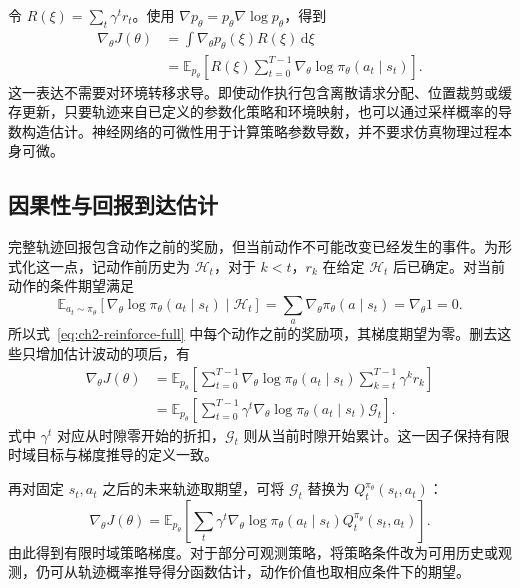 令 $R(\xi)=\sum_t\gamma^t r_t$。使用 $\nabla p_\theta=p_\theta\nabla\log p_\theta$，得到
\begin{align}
    \nabla_\theta J(\theta)
    &=\int \nabla_\theta p_\theta(\xi)R(\xi)\,\mathrm d\xi\\
    &=\mathbb E_{p_\theta}\left[R(\xi)\sum_{t=0}^{T-1}\nabla_\theta\log\pi_\theta(a_t\mid s_t)\right].
    \label{eq:ch2-reinforce-full}
\end{align}
这一表达不需要对环境转移求导。即使动作执行包含离散请求分配、位置裁剪或缓存更新，只要轨迹来自已定义的参数化策略和环境映射，也可以通过采样概率的导数构造估计。神经网络的可微性用于计算策略参数导数，并不要求仿真物理过程本身可微。

\subsection{因果性与回报到达估计}
\label{sec:ch2-reward-to-go}

完整轨迹回报包含动作之前的奖励，但当前动作不可能改变已经发生的事件。为形式化这一点，记动作前历史为 $\mathcal H_t$，对于 $k<t$，$r_k$ 在给定 $\mathcal H_t$ 后已确定。对当前动作的条件期望满足
\begin{equation}
    \mathbb E_{a_t\sim\pi_\theta}\left[\nabla_\theta\log\pi_\theta(a_t\mid s_t)\mid\mathcal H_t\right]
    =\sum_a\nabla_\theta\pi_\theta(a\mid s_t)
    =\nabla_\theta 1=0.
    \label{eq:ch2-score-zero}
\end{equation}
所以式~\eqref{eq:ch2-reinforce-full} 中每个动作之前的奖励项，其梯度期望为零。删去这些只增加估计波动的项后，有
\begin{align}
    \nabla_\theta J(\theta)
    &=\mathbb E_{p_\theta}\left[\sum_{t=0}^{T-1}
       \nabla_\theta\log\pi_\theta(a_t\mid s_t)
       \sum_{k=t}^{T-1}\gamma^k r_k\right]\\
    &=\mathbb E_{p_\theta}\left[\sum_{t=0}^{T-1}\gamma^t
       \nabla_\theta\log\pi_\theta(a_t\mid s_t)\mathcal G_t\right].
    \label{eq:ch2-reward-to-go-gradient}
\end{align}
式中 $\gamma^t$ 对应从时隙零开始的折扣，$\mathcal G_t$ 则从当前时隙开始累计。这一因子保持有限时域目标与梯度推导的定义一致。

再对固定 $s_t,a_t$ 之后的未来轨迹取期望，可将 $\mathcal G_t$ 替换为 $Q_t^{\pi_\theta}(s_t,a_t)$：
\begin{equation}
    \nabla_\theta J(\theta)
    =\mathbb E_{p_\theta}\left[\sum_t\gamma^t
    \nabla_\theta\log\pi_\theta(a_t\mid s_t)Q_t^{\pi_\theta}(s_t,a_t)\right].
    \label{eq:ch2-policy-gradient}
\end{equation}
由此得到有限时域策略梯度。对于部分可观测策略，将策略条件改为可用历史或观测，仍可从轨迹概率推导得分函数估计，动作价值也取相应条件下的期望。

